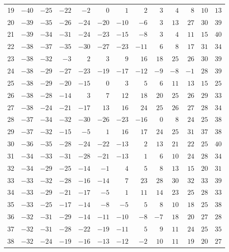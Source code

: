 \documentclass[11pt]{amsart}
\theoremstyle{definition}
\theoremstyle{remark}
\begin{document}
\begin{table}[htbp]
\begin{tabular}{r|*{12}{r}}
19 & $-40$ & $-25$ & $-22$ & $-2$ & $0$ & $1$ & $2$ & $3$ & $4$ & $8$ & $10$ & $13$ \\
20 & $-39$ & $-35$ & $-26$ & $-24$ & $-20$ & $-10$ & $-6$ & $3$ & $13$ & $27$ & $30$ & $39$ \\
21 & $-39$ & $-34$ & $-31$ & $-24$ & $-23$ & $-15$ & $-8$ & $3$ & $4$ & $11$ & $15$ & $40$ \\
22 & $-38$ & $-37$ & $-35$ & $-30$ & $-27$ & $-23$ & $-11$ & $6$ & $8$ & $17$ & $31$ & $34$ \\
23 & $-38$ & $-32$ & $-3$ & $2$ & $3$ & $9$ & $16$ & $18$ & $25$ & $26$ & $30$ & $39$ \\
24 & $-38$ & $-29$ & $-27$ & $-23$ & $-19$ & $-17$ & $-12$ & $-9$ & $-8$ & $-1$ & $28$ & $39$ \\
25 & $-38$ & $-29$ & $-20$ & $-15$ & $0$ & $3$ & $5$ & $6$ & $11$ & $13$ & $15$ & $25$ \\
26 & $-38$ & $-28$ & $-14$ & $3$ & $7$ & $12$ & $18$ & $20$ & $25$ & $26$ & $29$ & $33$ \\
27 & $-38$ & $-24$ & $-21$ & $-17$ & $13$ & $16$ & $24$ & $25$ & $26$ & $27$ & $28$ & $34$ \\
28 & $-37$ & $-34$ & $-32$ & $-30$ & $-26$ & $-23$ & $-16$ & $0$ & $8$ & $24$ & $25$ & $38$ \\
29 & $-37$ & $-32$ & $-15$ & $-5$ & $1$ & $16$ & $17$ & $24$ & $25$ & $31$ & $37$ & $38$ \\
30 & $-36$ & $-35$ & $-28$ & $-24$ & $-22$ & $-13$ & $2$ & $13$ & $21$ & $22$ & $25$ & $40$ \\
31 & $-34$ & $-33$ & $-31$ & $-28$ & $-21$ & $-13$ & $1$ & $6$ & $10$ & $24$ & $28$ & $34$ \\
32 & $-34$ & $-29$ & $-25$ & $-14$ & $-1$ & $4$ & $5$ & $8$ & $13$ & $15$ & $20$ & $31$ \\
33 & $-33$ & $-32$ & $-28$ & $-16$ & $-14$ & $7$ & $23$ & $28$ & $30$ & $32$ & $33$ & $39$ \\
34 & $-33$ & $-29$ & $-21$ & $-17$ & $-5$ & $1$ & $11$ & $14$ & $23$ & $25$ & $28$ & $33$ \\
35 & $-33$ & $-25$ & $-17$ & $-14$ & $-8$ & $-5$ & $5$ & $8$ & $10$ & $18$ & $25$ & $38$ \\
36 & $-32$ & $-31$ & $-29$ & $-14$ & $-11$ & $-10$ & $-8$ & $-7$ & $18$ & $20$ & $27$ & $28$ \\
37 & $-32$ & $-31$ & $-28$ & $-22$ & $-19$ & $-11$ & $5$ & $9$ & $11$ & $24$ & $25$ & $35$ \\
38 & $-32$ & $-24$ & $-19$ & $-16$ & $-13$ & $-12$ & $-2$ & $10$ & $11$ & $19$ & $20$ & $27$ \\

\end{tabular}
\end{table}
\end{document}

